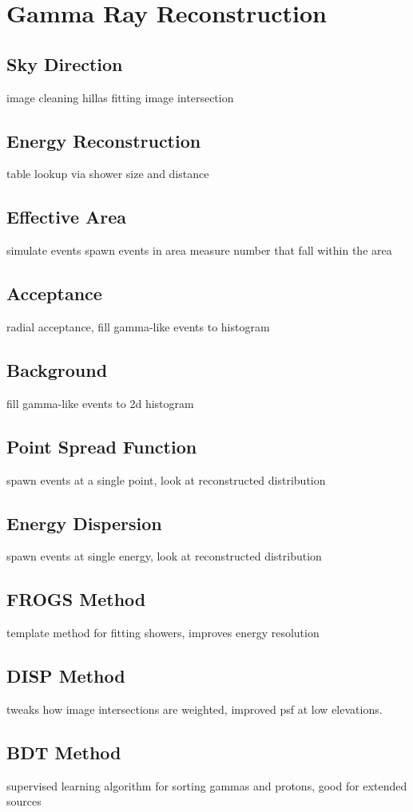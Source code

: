 \cleartooddpage[\thispagestyle{empty}]
\chapter{Gamma Ray Reconstruction}

\section{Sky Direction}
image cleaning
hillas fitting
image intersection

\section{Energy Reconstruction}
table lookup via shower size and distance

\section{Effective Area}

simulate events
spawn events in area
measure number that fall within the area

\section{Acceptance}
radial acceptance, fill gamma-like events to histogram

\section{Background}
fill gamma-like events to 2d histogram

\section{Point Spread Function}
spawn events at a single point, look at reconstructed distribution

\section{Energy Dispersion}
spawn events at single energy, look at reconstructed distribution

\section{FROGS Method}
template method for fitting showers, improves energy resolution

\section{DISP Method}
tweaks how image intersections are weighted, improved psf at low elevations.

\section{BDT Method}
supervised learning algorithm for sorting gammas and protons, good for extended sources

